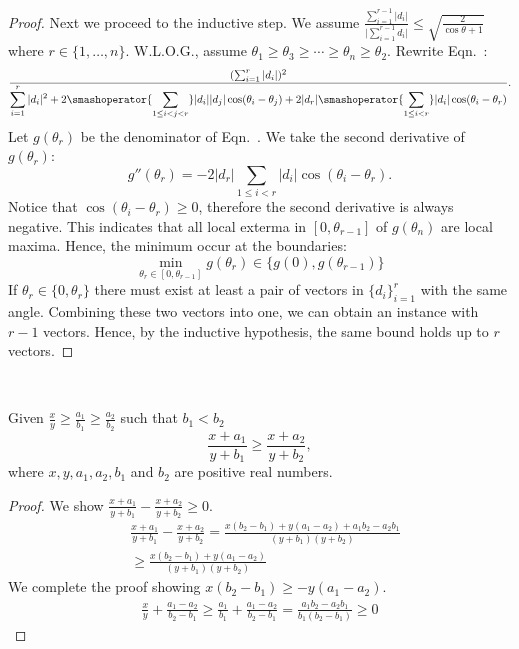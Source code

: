 \begin{proof}
Next we proceed to the inductive step. We assume $\frac{\sum_{i=1}^{r-1} |d_i| }{\big| \sum_{i=1}^{r-1} d_i \big|} \le \sqrt{\frac{2}{\cos \theta + 1}}$ where $r \in \{1,\ldots, n\}$. W.L.O.G., assume $\theta_1\ge\theta_3\ge \cdots \ge \theta_n \ge \theta_2$. Rewrite Eqn.~:
\begin{equation}
 \frac{ ( \sum_{i=1}^r |d_i|)^2 } { \displaystyle \sum_{i=1}^r |d_i|^2 + 2 \smashoperator{\sum_{1\le i<j<r}} |d_i|  |d_j| \cos (\theta_i - \theta_j) +  2 |d_r| \smashoperator{\sum_{1\le i<r}} |d_i|  \cos (\theta_i - \theta_r)}. \label{eq:den}
\end{equation}
Let $g(\theta_r)$ be the denominator of Eqn.~. We take the  second derivative of $g(\theta_r)$:
$$g''(\theta_r) = -2 |d_r| \sum_{1 \le i < r} |d_i| \cos(\theta_i - \theta_r).$$ Notice that $\cos(\theta_i - \theta_r) \ge 0$, therefore the second derivative is always negative. This indicates that all local exterma in $[0,\theta_{r-1}]$ of $g(\theta_n)$ are local maxima. Hence, the minimum occur at the boundaries:
\begin{equation}
\min_{\theta_r \in [0,\theta_{r-1}]}  g(\theta_r) \in \{g(0), g(\theta_{r-1})\}
\end{equation}
If $\theta_r \in \{0,\theta_r\}$ there must exist at least a pair of vectors in $\{d_i\}_{i=1}^r$ with the same angle. Combining these two vectors into one, we can obtain an instance with $r-1$ vectors. Hence, by the inductive hypothesis, the same bound holds up to $r$ vectors.
\end{proof}
\

\begin{lemma} 
\label{lem:frac}
Given $\frac{x}{y} \ge \frac{a_1}{b_1} \ge \frac{a_2}{b_2}$ such that  $b_1 < b_2$
$$ \frac{x+a_1}{y+b_1} \ge \frac{x+a_2}{y + b_2},$$
where $x,y,a_1,a_2,b_1$ and $b_2$ are positive real numbers.
 \end{lemma}
 \begin{proof}
 We show $\frac{x+a_1}{y+b_1} - \frac{x+a_2}{y + b_2} \ge 0 $.
 \begin{align}
 &\frac{x+a_1}{y+b_1} - \frac{x+a_2}{y + b_2}  = \frac{x(b_2 - b_1) + y(a_1 - a_2) + a_1 b_2 - a_2 b_1 }{(y+b_1)(y+b_2)} \nonumber\\
 &\ge  \frac{x(b_2 - b_1) + y(a_1 - a_2) }{(y+b_1)(y+b_2)}
 \end{align}
 We complete the proof  showing $x(b_2 - b_1) \ge   - y(a_1 - a_2)$.
 \begin{align}
 \frac{x}{y} + \frac{a_1 - a_2}{b_2 - b_1} \ge   \frac{a_1}{b_1} + \frac{a_1 - a_2}{b_2 - b_1} = \frac{a_1 b_2 - a_2 b_1}{b_1 ( b_2 - b_1)} \ge 0
 \end{align}
 \end{proof}
 
